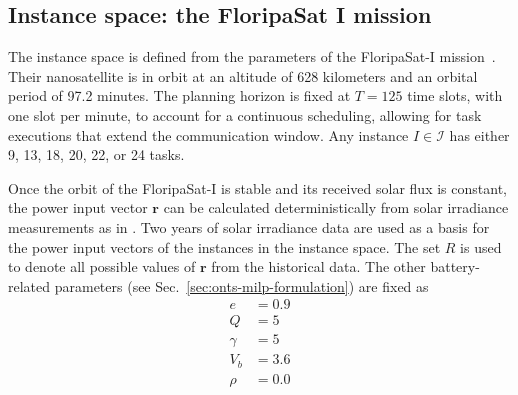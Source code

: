 \subsection{Instance space: the FloripaSat I mission}\label{sec:instance-space}

The instance space is defined from the parameters of the FloripaSat-I mission~\cite{marcelinoCriticalEmbeddedSystem2020}.
Their nanosatellite is in orbit at an altitude of 628 kilometers and an orbital period of 97.2 minutes.
The planning horizon is fixed at $T=125$ time slots, with one slot per minute, to account for a continuous scheduling, allowing for task executions that extend the communication window.
Any instance $I\in \mathcal{I}$ has either 9, 13, 18, 20, 22, or 24 tasks.

Once the orbit of the FloripaSat-I is stable and its received solar flux is constant, the power input vector $\bm{r}$ can be calculated deterministically from solar irradiance measurements as in .
Two years of solar irradiance data are used as a basis for the power input vectors of the instances in the instance space.
The set $R$ is used to denote all possible values of $\bm{r}$ from the historical data.
The other battery-related parameters (see Sec.~\ref{sec:onts-milp-formulation}) are fixed as 
\begin{align*}
    e &= 0.9 \\
    Q &= 5 \\
    \gamma &= 5 \\
    V_b &= 3.6 \\
    \rho &= 0.0
\end{align*}

